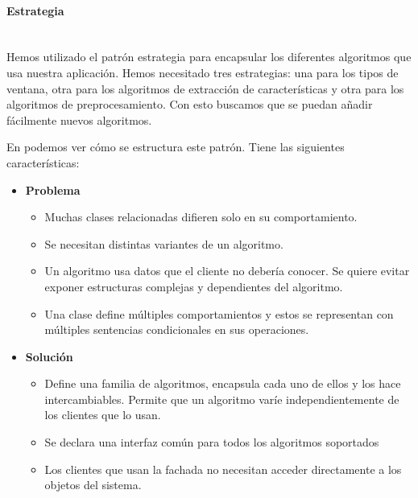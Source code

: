 \paragraph{Estrategia}\mbox{} \\
Hemos utilizado el patrón estrategia para encapsular los diferentes algoritmos que usa nuestra aplicación. Hemos necesitado tres estrategias: una para los tipos de ventana, otra para los algoritmos de extracción de características y otra para los algoritmos de preprocesamiento. Con esto buscamos que se puedan añadir fácilmente nuevos algoritmos.

En  podemos ver cómo se estructura este patrón. Tiene las siguientes características:


\begin{itemize}
\item \textbf{Problema}

\begin{itemize}
\item Muchas clases relacionadas difieren solo en su comportamiento.
\item Se necesitan distintas variantes de un algoritmo.
\item Un algoritmo usa datos que el cliente no debería conocer. Se quiere evitar exponer estructuras complejas y dependientes del algoritmo.
\item Una clase define múltiples comportamientos y estos se representan con múltiples sentencias condicionales en sus operaciones.
\end{itemize}

\item \textbf{Solución}

\begin{itemize}
\item Define una familia de algoritmos, encapsula cada uno de ellos y los hace intercambiables. Permite que un algoritmo varíe independientemente de los clientes que lo usan.
\item Se declara una interfaz común para todos los algoritmos soportados
\item Los clientes que usan la fachada no necesitan acceder directamente a los objetos del sistema.
\end{itemize}
\end{itemize}

